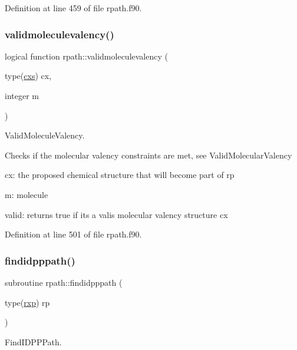 Definition at line 459 of file rpath.\+f90.

\mbox{\label{namespacerpath_af041cd0a3cf96707ba0d0588a00c9e0f}} 
\subsubsection{\texorpdfstring{validmoleculevalency()}{validmoleculevalency()}}
{\footnotesize\ttfamily logical function rpath\+::validmoleculevalency (\begin{DoxyParamCaption}\item[{type(\mbox{\hyperlink{structchemstr_1_1cxs}{cxs}})}]{cx,  }\item[{integer}]{m }\end{DoxyParamCaption})}



Valid\+Molecule\+Valency. 

Checks if the molecular valency constraints are met, see Valid\+Molecular\+Valency


\begin{DoxyItemize}
\item cx\+: the proposed chemical structure that will become part of rp
\item m\+: molecule
\item valid\+: returns true if its a valis molecular valency structure cx 
\end{DoxyItemize}

Definition at line 501 of file rpath.\+f90.

\mbox{\label{namespacerpath_a3c3083be4489b8e7ed7330dcc26fb62f}} 
\subsubsection{\texorpdfstring{findidpppath()}{findidpppath()}}
{\footnotesize\ttfamily subroutine rpath\+::findidpppath (\begin{DoxyParamCaption}\item[{type(\mbox{\hyperlink{structrpath_1_1rxp}{rxp}})}]{rp }\end{DoxyParamCaption})}



Find\+I\+D\+P\+P\+Path. 

